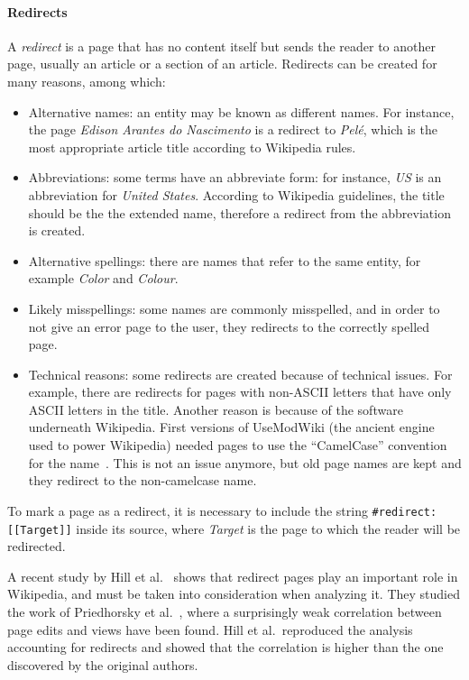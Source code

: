 \paragraph{Redirects}
A \emph{redirect} is a page that has no content itself but sends the reader to another page, usually an article or a section of an article.
Redirects can be created for many reasons, among which:

\begin{itemize}
    \item Alternative names: an entity may be known as different names.
    For instance, the page \emph{Edison Arantes do Nascimento} is a redirect to \emph{Pelé}, which is the most appropriate article title according to Wikipedia rules.
    \item Abbreviations: some terms have an abbreviate form: for instance, \emph{US} is an abbreviation for \emph{United States}.
    According to Wikipedia guidelines, the title should be the the extended name, therefore a redirect from the abbreviation is created.
    \item Alternative spellings: there are names that refer to the same entity, for example \emph{Color} and \emph{Colour}.
    \item Likely misspellings: some names are commonly misspelled, and in order to not give an error page to the user, they redirects to the correctly spelled page.
    \item Technical reasons: some redirects are created because of technical issues.
    For example, there are redirects for pages with non-ASCII letters that have only ASCII letters in the title.
    Another reason is because of the software underneath Wikipedia.
    First versions of UseModWiki (the ancient engine used to power Wikipedia) needed pages to use the ``CamelCase'' convention for the name~\cite{wiki:camelcase}.
    This is not an issue anymore, but old page names are kept and they redirect to the non-camelcase name.
\end{itemize}

To mark a page as a redirect, it is necessary to include the string
\texttt{#redirect: [[Target]]} inside its source, where \emph{Target} is the page to which the reader will be redirected.

A recent study by Hill et al.~\cite{Hill2014} shows that redirect pages play an important role in Wikipedia, and must be taken into consideration when analyzing it.
They studied the work of Priedhorsky et al.~\cite{Priedhorsky2007}, where a surprisingly weak correlation between page edits and views have been found.
Hill et al.\ reproduced the analysis accounting for redirects and showed that the correlation is higher than the one discovered by the original authors.

